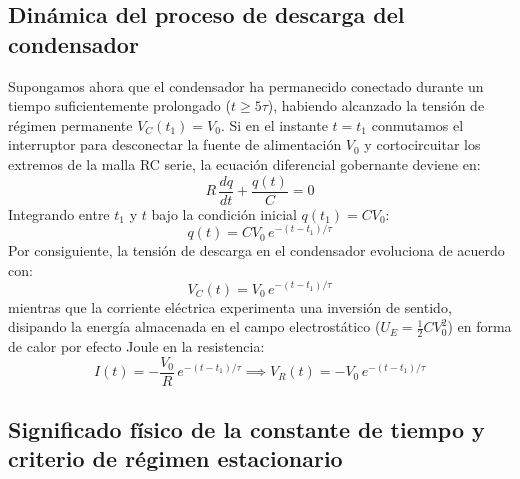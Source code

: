 \subsection{Dinámica del proceso de descarga del condensador}

Supongamos ahora que el condensador ha permanecido conectado durante un tiempo suficientemente prolongado ($t \ge 5\tau$), habiendo alcanzado la tensión de régimen permanente $V_C(t_1) = V_0$. Si en el instante $t = t_1$ conmutamos el interruptor para desconectar la fuente de alimentación $V_0$ y cortocircuitar los extremos de la malla RC serie, la ecuación diferencial gobernante deviene en:
\begin{equation}
    R\,\frac{dq}{dt} + \frac{q(t)}{C} = 0
    \label{eq:edo_descarga}
\end{equation}
Integrando entre $t_1$ y $t$ bajo la condición inicial $q(t_1) = C V_0$:
\begin{equation}
    q(t) = C V_0\,e^{-(t - t_1) / \tau}
    \label{eq:q_descarga}
\end{equation}
Por consiguiente, la tensión de descarga en el condensador evoluciona de acuerdo con:
\begin{equation}
    V_C(t) = V_0\,e^{-(t - t_1) / \tau}
    \label{eq:vc_descarga}
\end{equation}
mientras que la corriente eléctrica experimenta una inversión de sentido, disipando la energía almacenada en el campo electrostático ($U_E = \frac{1}{2} C V_0^2$) en forma de calor por efecto Joule en la resistencia:
\begin{equation}
    I(t) = -\frac{V_0}{R}\,e^{-(t - t_1) / \tau} \implies V_R(t) = -V_0\,e^{-(t - t_1) / \tau}
    \label{eq:vr_descarga}
\end{equation}

\subsection{Significado físico de la constante de tiempo y criterio de régimen estacionario}

